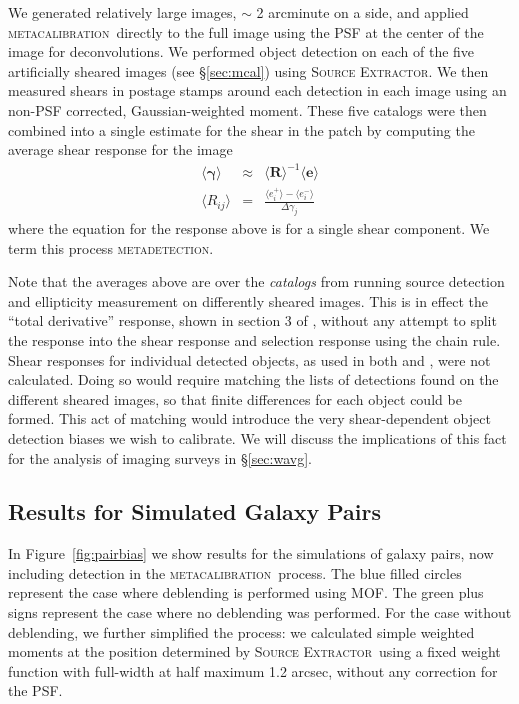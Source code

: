 \documentclass[iop, appendixfloats, numberedappendix, apj]{emulateapj}
\newcommand{\mcal}{\textsc{metacalibration}}
\newcommand{\mdet}{\textsc{metadetection}}
\newcommand{\sx}{\textsc{Source Extractor}}
\begin{document}
We generated relatively large images, $\sim$ 2 arcminute on a side, and applied
\mcal\ directly to the full image using the PSF at the center of the image for
deconvolutions.  We performed object detection on each of the five artificially
sheared images (see \S \ref{sec:mcal}) using \sx.  We then
measured shears in postage stamps around each detection in each image using an
non-PSF corrected, Gaussian-weighted moment.  These five catalogs were then
combined into a single estimate for the shear in the patch by computing the
average shear response for the image
\begin{eqnarray}
\langle \boldsymbol\gamma \rangle &\approx& \langle \boldsymbol{R}\rangle^{-1}\langle\boldsymbol{e}\rangle\nonumber\\
\langle R_{ij}\rangle &=& \frac{\langle e_i^{+}\rangle - \langle e_i^{-}\rangle}{\Delta\gamma_j}
\end{eqnarray}
where the equation for the response above is for a single shear component. We term this
process \mdet.

Note that the averages above are over the {\it catalogs} from running source
detection and ellipticity measurement on differently sheared images. This is in
effect the ``total derivative'' response, shown in section 3 of
\cite{SheldonMcal2017}, without any attempt to split the response into the
shear response and selection response using the chain rule.  Shear responses
for individual detected objects, as used in both \cite{SheldonMcal2017} and
\cite{HuffMcal2017}, were not calculated.  Doing so would require matching the
lists of detections found on the different sheared images, so that finite
differences for each object could be formed.  This act of matching would
introduce the very shear-dependent object detection biases we wish to
calibrate.  We will discuss the implications of this fact for the analysis of
imaging surveys in \S \ref{sec:wavg}.

\subsection{Results for Simulated Galaxy Pairs}
\label{sec:mdetpairs}

In Figure~\ref{fig:pairbias} we show results for the simulations of galaxy
pairs, now including detection in the \mcal\ process. The blue filled circles
represent the case where deblending is performed using MOF. The green plus
signs represent the case where no deblending was performed. For the case
without deblending,  we further simplified the process: we calculated
simple weighted moments at the position determined by \sx\ using a fixed weight function
with full-width at half maximum 1.2 arcsec, without any correction for the PSF.
\end{document}

